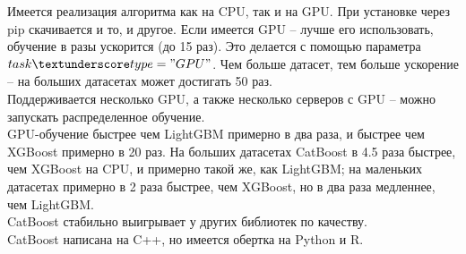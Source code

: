 \documentclass[a4paper,12pt]{article}
\begin{document}
Имеется реализация алгоритма как на CPU, так и на GPU. При установке через pip скачивается и то, и другое. Если имеется GPU – лучше его использовать, обучение в разы ускорится (до 15 раз). Это делается с помощью параметра $task \textunderscore type="GPU"$. Чем больше датасет, тем больше ускорение – на больших датасетах может достигать 50 раз. \\

Поддерживается несколько GPU, а также несколько серверов с GPU – можно запускать распределенное обучение. \\
 
GPU-обучение быстрее чем LightGBM примерно в два раза, и быстрее чем XGBoost примерно в 20 раз. На больших датасетах CatBoost в 4.5 раза быстрее, чем XGBoost на CPU, и примерно такой же, как LightGBM; на маленьких датасетах примерно в 2 раза быстрее, чем XGBoost, но в два раза медленнее, чем LightGBM. \\

CatBoost стабильно выигрывает у других библиотек по качеству. \\

CatBoost написана на C++, но имеется обертка на Python и R. \\
\end{document}

